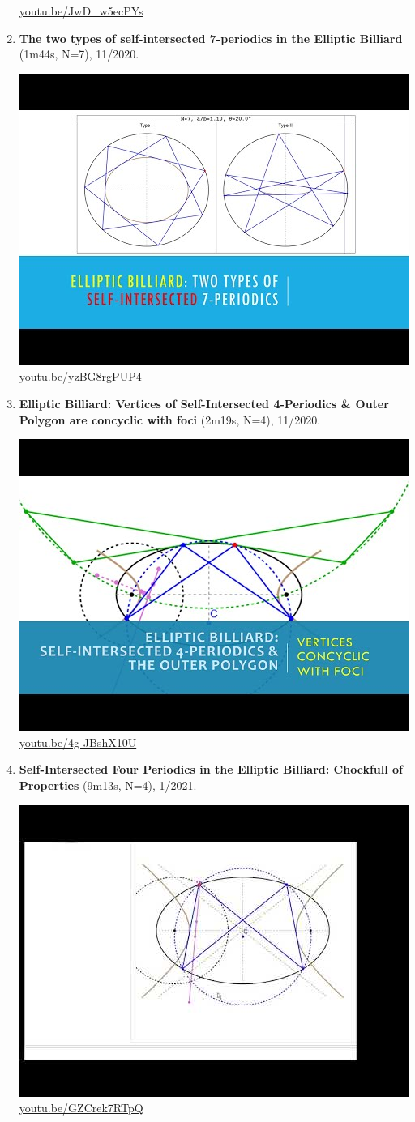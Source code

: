 \documentclass[12pt]{amsart}
\begin{document}
\begin{enumerate}[resume]
\begin{center}
\href{https://youtu.be/JwD_w5ecPYs}{\url{youtu.be/JwD\_w5ecPYs}}\end{center}
% 
\item \textbf{The two types of self-intersected 7-periodics in the Elliptic Billiard} (1m44s, N=7), 11/2020. 
\begin{center}\includegraphics[width=.5\textwidth]{pics/yzBG8rgPUP4.jpg} \\ 
\href{https://youtu.be/yzBG8rgPUP4}{\url{youtu.be/yzBG8rgPUP4}}\end{center}
% 
\item \textbf{Elliptic Billiard: Vertices of Self-Intersected 4-Periodics \& Outer Polygon are concyclic with foci} (2m19s, N=4), 11/2020. 
\begin{center}\includegraphics[width=.5\textwidth]{pics/4g-JBshX10U.jpg} \\ 
\href{https://youtu.be/4g-JBshX10U}{\url{youtu.be/4g-JBshX10U}}\end{center}
% 
\item \textbf{Self-Intersected Four Periodics in the Elliptic Billiard: Chockfull of Properties} (9m13s, N=4), 1/2021. 
\begin{center}\includegraphics[width=.5\textwidth]{pics/GZCrek7RTpQ.jpg} \\ 
\href{https://youtu.be/GZCrek7RTpQ}{\url{youtu.be/GZCrek7RTpQ}}\end{center}
% 
\end{enumerate}
\end{document}
